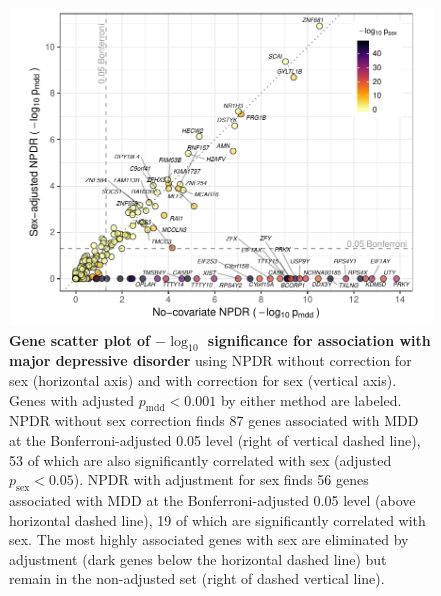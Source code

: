 \documentclass[10pt]{article}
\begin{document}
\begin{figure}[!tpb]%
\centerline{\includegraphics[]{../figs/mostafavi_npdrs_mdd.pdf}}
\caption{{\bf Gene scatter plot of $-\log_{10}$ significance for association with major depressive disorder}
using NPDR without correction for sex (horizontal axis) and with correction for sex (vertical axis). Genes with adjusted $p_\textrm{mdd} < 0.001$ by either method are labeled. NPDR without sex correction finds 87 genes associated with MDD at the Bonferroni-adjusted 0.05 level (right of vertical dashed line), 53 of which are also significantly correlated with sex (adjusted $p_\textrm{sex} < 0.05$).  NPDR with adjustment for sex finds 56 genes associated with MDD at the Bonferroni-adjusted 0.05 level (above horizontal dashed line), 19 of which are significantly correlated with sex. The most highly associated genes with sex are eliminated by adjustment (dark genes below the horizontal dashed line) but remain in the non-adjusted set (right of dashed vertical line). }
\label{fig:npdrs_mdd}
\end{figure}

% 
\end{document}

